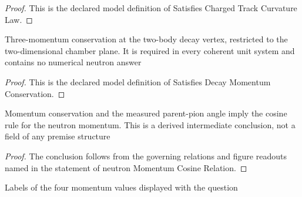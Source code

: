 \begin{proof}
  This is the declared model definition of Satisfies Charged Track Curvature Law.
\end{proof}
\begin{definition}
  \label{def:physics:phyx-mini-0540:phyxminiproblems-problemphyxmini0540-satisfiesdecaymomentumconservation}
  Three-momentum conservation at the two-body decay vertex, restricted to the two-dimensional chamber plane. It is required in every coherent unit system and contains no numerical neutron answer
\end{definition}
\begin{proof}
  This is the declared model definition of Satisfies Decay Momentum Conservation.
\end{proof}
\begin{lemma}
  \label{lem:physics:phyx-mini-0540:phyxminiproblems-problemphyxmini0540-neutronmomentumcosinerelation}
  Momentum conservation and the measured parent-pion angle imply the cosine rule for the neutron momentum. This is a derived intermediate conclusion, not a field of any premise structure
\end{lemma}
\begin{proof}
  The conclusion follows from the governing relations and figure readouts named in the statement of neutron Momentum Cosine Relation.
\end{proof}
\begin{definition}
  \label{def:physics:phyx-mini-0540:phyxminiproblems-problemphyxmini0540-answerchoice}
  Labels of the four momentum values displayed with the question
\end{definition}
